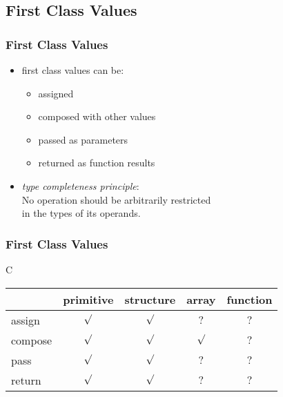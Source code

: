 \documentclass[dvipsnames]{beamer}
\theoremstyle{plain}
\begin{document}
\subsection{First Class Values}

\begin{frame}
  \frametitle{First Class Values}

  \begin{itemize}
    \item \alert{first class values} can be:
    \begin{itemize}
      \item assigned
      \item composed with other values
      \item passed as parameters
      \item returned as function results
    \end{itemize}

    \pause
    \bigskip
    \item \emph{type completeness principle}:\\
      No operation should be arbitrarily restricted\\
      in the types of its operands.
  \end{itemize}
\end{frame}

\begin{frame}
  \frametitle{First Class Values}

  \begin{block}{C}
    \begin{table}
      \begin{tabular}{l||c|c|c|c}
                & primitive & structure &  array  & function\\\hline\hline
        assign  &  $\surd$  &  $\surd$  &   $?$   &    $?$  \\\hline
        compose &  $\surd$  &  $\surd$  & $\surd$ &    $?$  \\\hline
        pass    &  $\surd$  &  $\surd$  &   $?$   &    $?$  \\\hline
        return  &  $\surd$  &  $\surd$  &   $?$   &    $?$
      \end{tabular}
    \end{table}
  \end{block}
\end{frame}
\end{document}
